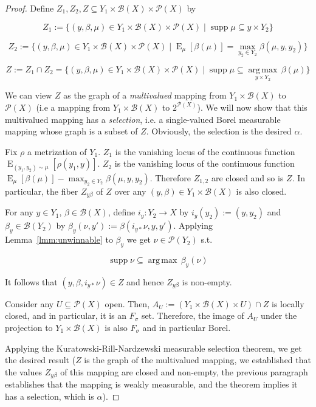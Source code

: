\documentclass[11pt]{article}
\theoremstyle{definition}
\theoremstyle{plain}
\newcommand{\Argmax}[1]{\underset{#1}{\operatorname{arg\,max}}\,}
\DeclareMathOperator{\E}{E}
\newcommand{\PM}{\mathcal{P}}
\DeclareMathOperator{\Sp}{supp}
\newcommand{\Gm}{\mathcal{B}}
\begin{document}
\begin{proof}

Define ${Z_1, Z_2, Z \subseteq Y_1 \times \Gm\left(X\right) \times \PM\left(X\right)}$ by

$${Z_1:=\{\left(y,\beta,\mu\right) \in Y_1 \times \Gm\left(X\right) \times \PM\left(X\right) \mid \Sp \mu \subseteq y \times Y_2\}}$$

$${Z_2:=\{\left(y,\beta,\mu\right) \in Y_1 \times \Gm\left(X\right) \times \PM\left(X\right) \mid \E_\mu\left[\beta\left(\mu\right)\right] = \max_{y_2 \in Y_2} \beta\left(\mu,y,y_2\right)\}}$$

$${Z:=Z_1 \cap Z_2 =\{\left(y,\beta,\mu\right) \in Y_1 \times \Gm\left(X\right) \times \PM\left(X\right) \mid \Sp \mu \subseteq \Argmax{y \times Y_2} \beta\left(\mu\right)\}}$$

We can view ${Z}$ as the graph of a \emph{multivalued} mapping from ${Y_1 \times \Gm\left(X\right)}$ to ${\PM\left(X\right)}$ (i.e a mapping from ${Y_1 \times \Gm\left(X\right)}$ to $2^{\PM\left(X\right)}$). We will now show that this multivalued mapping has a \emph{selection}, i.e. a single-valued Borel measurable mapping whose graph is a subset of $Z$. Obviously, the selection is the desired ${\alpha}$.

Fix $\rho$ a metrization of $Y_1$. $Z_1$ is the vanishing locus of the continuous function $\E_{\left(y_1, y_2\right) \sim \mu}\left[\rho\left(y_1,y\right)\right]$. $Z_2$ is the vanishing locus of the continuous function $\E_\mu\left[\beta\left(\mu\right)\right] - \max_{y_2 \in Y_2} \beta\left(\mu,y,y_2\right)$. Therefore $Z_{1,2}$ are closed and so is $Z$. In particular, the fiber ${Z_{y\beta}}$ of ${Z}$ over any ${\left(y,\beta\right) \in Y_1 \times \Gm\left(X\right)}$ is also closed. 

For any ${y \in Y_1}$, ${\beta \in \Gm\left(X\right)}$, define ${i_y: Y_2 \rightarrow X}$ by ${i_y\left(y_2\right):=\left(y,y_2\right)}$ and ${\beta_y \in \Gm\left(Y_{2}\right)}$ by $\beta_y\left(\nu,y'\right):=\beta\left(i_{y*}\nu,y,y'\right)$. Applying Lemma~\ref{lmm:unwinnable} to ${\beta_y}$ we get ${\nu \in \PM\left(Y_2\right)}$ s.t.

$$\Sp \nu \subseteq \Argmax{} \beta_y\left(\nu\right)$$

It follows that ${\left(y,\beta,i_{y*}\nu\right) \in Z}$ and hence ${Z_{y\beta}}$ is non-empty.

Consider any ${U \subseteq \PM\left(X\right)}$ open. Then, ${A_U:=\left(Y_{1} \times \Gm\left(X\right) \times U\right) \cap Z}$ is locally closed, and in particular, it is an ${F_\sigma}$ set. Therefore, the image of ${A_U}$ under the projection to ${Y_{1} \times \Gm\left(X\right)}$ is also ${F_\sigma}$ and in particular Borel. 

Applying the Kuratowski-Rill-Nardzewski measurable selection theorem, we get the desired result ($Z$ is the graph of the multivalued mapping, we established that the values $Z_{y\beta}$ of this mapping are closed and non-empty, the previous paragraph establishes that the mapping is weakly measurable, and the theorem implies it has a selection, which is $\alpha$).
\end{proof}
\end{document}
